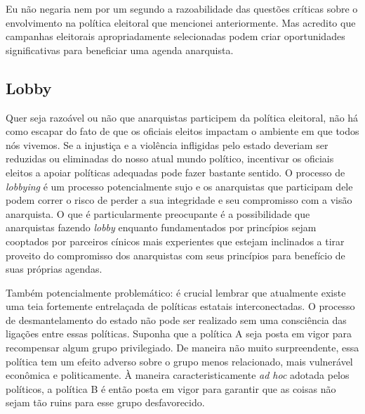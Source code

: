 Eu não negaria nem por um segundo a razoabilidade das questões críticas sobre o envolvimento na política eleitoral que mencionei anteriormente. Mas acredito que campanhas eleitorais apropriadamente selecionadas podem criar oportunidades significativas para beneficiar uma agenda anarquista.

\subsection*{Lobby}

Quer seja razoável ou não que anarquistas participem da política eleitoral, não há como escapar do fato de que os oficiais eleitos impactam o ambiente em que todos nós vivemos. Se a injustiça e a violência infligidas pelo estado deveriam ser reduzidas ou eliminadas do nosso atual mundo político, incentivar os oficiais eleitos a apoiar políticas adequadas pode fazer bastante sentido. O processo de \emph{lobbying} é um processo potencialmente sujo e os anarquistas que participam dele podem correr o risco de perder a sua integridade e seu compromisso com a visão anarquista. O que é particularmente preocupante é a possibilidade que anarquistas fazendo \emph{lobby} enquanto fundamentados por princípios sejam cooptados por parceiros cínicos mais experientes que estejam inclinados a tirar proveito do compromisso dos anarquistas com seus princípios para benefício de suas próprias agendas.

Também potencialmente problemático: é crucial lembrar que atualmente existe uma teia fortemente entrelaçada de políticas estatais interconectadas. O processo de desmantelamento do estado não pode ser realizado sem uma consciência das ligações entre essas políticas. Suponha que a política A seja posta em vigor para recompensar algum grupo privilegiado. De maneira não muito surpreendente, essa política tem um efeito adverso sobre o grupo menos relacionado, mais vulnerável econômica e politicamente. À maneira caracteristicamente \emph{ad hoc} adotada pelos políticos, a política B é então posta em vigor para garantir que as coisas não sejam tão ruins para esse grupo desfavorecido.

